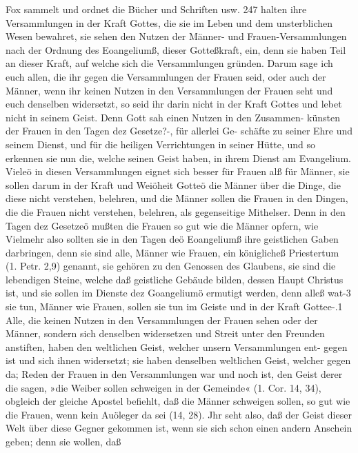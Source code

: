 Fox sammelt und ordnet die Bücher und Schriften usw. 247
halten ihre Versammlungen in der Kraft Gottes, die sie im Leben
und dem unsterblichen Wesen bewahret, sie sehen den Nutzen
der Männer- und Frauen-Versammlungen nach der Ordnung des
Eoangeliumß, dieser Gotteßkraft, ein, denn sie haben Teil an dieser
Kraft, auf welche sich die Versammlungen gründen. Darum
sage ich euch allen, die ihr gegen die Versammlungen der Frauen
seid, oder auch der Männer, wenn ihr keinen Nutzen in den
Versammlungen der Frauen seht und euch denselben widersetzt,
so seid ihr darin nicht in der Kraft Gottes und lebet nicht in
seinem Geist. Denn Gott sah einen Nutzen in den Zusammen-
künsten der Frauen in den Tagen dez Gesetze?-, für allerlei Ge-
schäfte zu seiner Ehre und seinem Dienst, und für die heiligen
Verrichtungen in seiner Hütte, und so erkennen sie nun die, welche
seinen Geist haben, in ihrem Dienst am Evangelium. Vieleö in
diesen Versammlungen eignet sich besser für Frauen alß für Männer,
sie sollen darum in der Kraft und Weiöheit Gotteö die Männer
über die Dinge, die diese nicht verstehen, belehren, und die
Männer sollen die Frauen in den Dingen, die die Frauen nicht
verstehen, belehren, als gegenseitige Mithelser. Denn in den Tagen
dez Gesetzeö mußten die Frauen so gut wie die Männer opfern,
wie Vielmehr also sollten sie in den Tagen deö Eoangeliumß ihre
geistlichen Gaben darbringen, denn sie sind alle, Männer wie
Frauen, ein königlicheß Priestertum (1. Petr. 2,9) genannt, sie
gehören zu den Genossen des Glaubens, sie sind die lebendigen
Steine, welche daß geistliche Gebäude bilden, dessen Haupt Christus
ist, und sie sollen im Dienste dez Goangeliumö ermutigt werden,
denn alleß wat-3 sie tun, Männer wie Frauen, sollen sie tun im
Geiste und in der Kraft Gottee-.1 Alle, die keinen Nutzen in den
Versammlungen der Frauen sehen oder der Männer, sondern sich
denselben widersetzen und Streit unter den Freunden anstiften,
haben den weltlichen Geist, welcher unsern Versammlungen ent-
gegen ist und sich ihnen widersetzt; sie haben denselben weltlichen
Geist, welcher gegen da; Reden der Frauen in den Versammlungen
war und noch ist, den Geist derer die sagen, »die Weiber sollen
schweigen in der Gemeinde« (1. Cor. 14, 34), obgleich der gleiche
Apostel befiehlt, daß die Männer schweigen sollen, so gut wie
die Frauen, wenn kein Auöleger da sei (14, 28). Jhr seht also,
daß der Geist dieser Welt über diese Gegner gekommen ist, wenn
sie sich schon einen andern Anschein geben; denn sie wollen, daß


